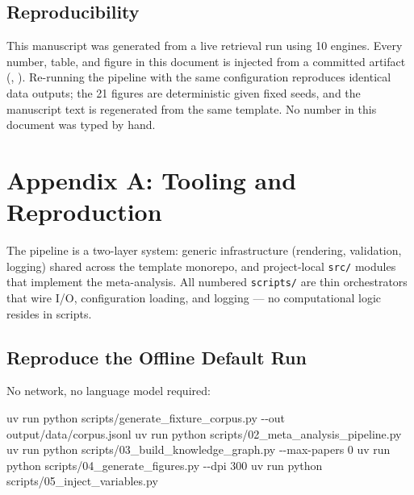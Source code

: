 \documentclass[
  english,
]{article}
\newenvironment{Shaded}{}{}
\newcommand{\AttributeTok}[1]{\textcolor[rgb]{0.49,0.56,0.16}{#1}}
\newcommand{\ExtensionTok}[1]{#1}
\newcommand{\NormalTok}[1]{#1}
\begin{document}
\subsection{Reproducibility}\label{reproducibility}

This manuscript was generated from a live retrieval run using 10
engines. Every number, table, and figure in this document is injected
from a committed artifact (,
). Re-running the pipeline with the same
configuration reproduces identical data outputs; the 21 figures are
deterministic given fixed seeds, and the manuscript text is regenerated
from the same template. No number in this document was typed by hand.

\newpage

\section{Appendix A: Tooling and
Reproduction}\label{appendix-a-tooling-and-reproduction}

The pipeline is a two-layer system: generic infrastructure (rendering,
validation, logging) shared across the template monorepo, and
project-local \texttt{src/} modules that implement the meta-analysis.
All numbered \texttt{scripts/} are thin orchestrators that wire I/O,
configuration loading, and logging --- no computational logic resides in
scripts.

\subsection{Reproduce the Offline Default
Run}\label{reproduce-the-offline-default-run}

No network, no language model required:

\begin{Shaded}
\begin{Highlighting}[]
\ExtensionTok{uv}\NormalTok{ run python scripts/generate\_fixture\_corpus.py }\AttributeTok{{-}{-}out}\NormalTok{ output/data/corpus.jsonl}
\ExtensionTok{uv}\NormalTok{ run python scripts/02\_meta\_analysis\_pipeline.py}
\ExtensionTok{uv}\NormalTok{ run python scripts/03\_build\_knowledge\_graph.py }\AttributeTok{{-}{-}max{-}papers}\NormalTok{ 0}
\ExtensionTok{uv}\NormalTok{ run python scripts/04\_generate\_figures.py }\AttributeTok{{-}{-}dpi}\NormalTok{ 300}
\ExtensionTok{uv}\NormalTok{ run python scripts/05\_inject\_variables.py}
\end{Highlighting}
\end{Shaded}
\end{document}
